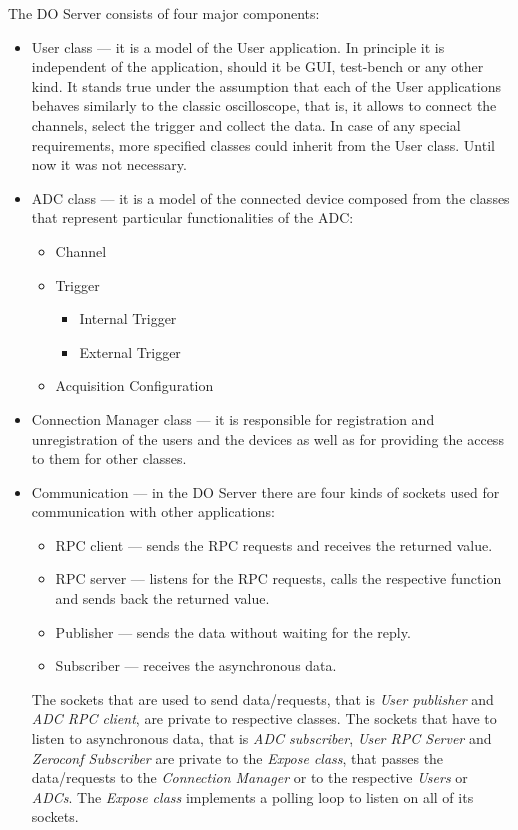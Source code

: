         The DO Server consists of four major components:
        \begin{itemize}
            \item User class --- it is a model of the User application. In principle it is independent of the application, should it be GUI, test-bench or any other kind. It stands true under the assumption that each of the User applications behaves similarly to the classic oscilloscope, that is, it allows to connect the channels, select the trigger and collect the data. In case of any special requirements, more specified classes could inherit from the User class. Until now it was not necessary.
            \item ADC class --- it is a model of the connected device composed from the classes that represent particular functionalities of the ADC:
            \begin{itemize}
                \item Channel
                \item Trigger
                \begin{itemize}
                    \item Internal Trigger
                    \item External Trigger
                \end{itemize}
                \item Acquisition Configuration
            \end{itemize}
            \item Connection Manager class --- it is responsible for registration and unregistration of the users and the devices as well as for providing the access to them for other classes.
        
            \item Communication --- in the DO Server there are four kinds of sockets used for communication with other applications:
            \begin{itemize}
                \item RPC client --- sends the RPC requests and receives the returned value.
                \item RPC server --- listens for the RPC requests, calls the respective function and sends back the returned value.
                \item Publisher --- sends the data without waiting for the reply.
                \item Subscriber --- receives the asynchronous data.
            \end{itemize}
            The sockets that are used to send data/requests, that is \textit{User publisher} and \textit{ADC RPC client}, are private to respective classes. The sockets that have to listen to asynchronous data, that is \textit{ADC subscriber}, \textit{User RPC Server} and \textit{Zeroconf Subscriber} are private to the \textit{Expose class}, that passes the data/requests to the \textit{Connection Manager} or to the respective \textit{Users} or \textit{ADCs}. The \textit{Expose class} implements a polling loop to listen on all of its sockets.
        \end{itemize}
        
